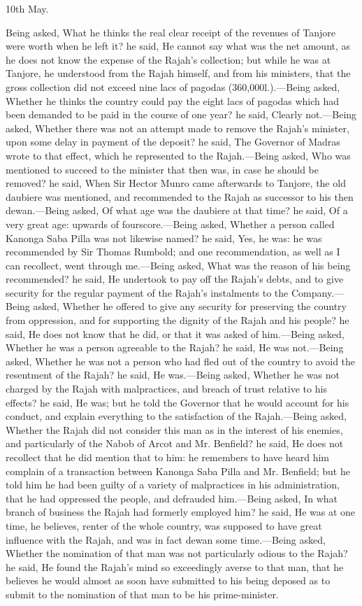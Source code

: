 \vspace{0.3cm}
\hfill 10th May.

Being asked, What he thinks the real clear receipt of the revenues of Tanjore were worth when he left it? he said, He cannot say what was the net amount, as he does not know the expense of the Rajah's collection; but while he was at Tanjore, he understood from the Rajah himself, and from his ministers, that the gross collection did not exceed nine lacs of pagodas (360,000l.).—Being asked, Whether he thinks the country could pay the eight lacs of pagodas which had been demanded to be paid in the course of one year? he said, Clearly not.—Being asked, Whether there was not an attempt made to remove the Rajah's minister, upon some delay in payment of the deposit? he said, The Governor of Madras wrote to that effect, which he represented to the Rajah.—Being asked, Who was mentioned to succeed to the minister that then was, in case he should be removed? he said, When Sir Hector Munro came afterwards to Tanjore, the old daubiere was mentioned, and recommended to the Rajah as successor to his then dewan.—Being asked, Of what age was the daubiere at that time? he said, Of a very great age: upwards of fourscore.—Being asked, Whether a person called Kanonga Saba Pilla was not likewise named? he said, Yes, he was: he was recommended by Sir Thomas Rumbold; and one recommendation, as well as I can recollect, went through me.—Being asked, What was the reason of his being recommended? he said, He undertook to pay off the Rajah's debts, and to give security for the regular payment of the Rajah's instalments to the Company.—Being asked, Whether he offered to give any security for preserving the country from oppression, and for supporting the dignity of the Rajah and his people? he said, He does not know that he did, or that it was asked of him.—Being asked, Whether he was a person agreeable to the Rajah? he said, He was not.—Being asked, Whether he was not a person who had fled out of the country to avoid the resentment of the Rajah? he said, He was.—Being asked, Whether he was not charged by the Rajah with malpractices, and breach of trust relative to his effects? he said, He was; but he told the Governor that he would account for his conduct, and explain everything to the satisfaction of the Rajah.—Being asked, Whether the Rajah did not consider this man as in the interest of his enemies, and particularly of the Nabob of Arcot and Mr. Benfield? he said, He does not recollect that he did mention that to him: he remembers to have heard him complain of a transaction between Kanonga Saba Pilla and Mr. Benfield; but he told him he had been guilty of a variety of malpractices in his administration, that he had oppressed the people, and defrauded him.—Being asked, In what branch of business the Rajah had formerly employed him? he said, He was at one time, he believes, renter of the whole country, was supposed to have great influence with the Rajah, and was in fact dewan some time.—Being asked, Whether the nomination of that man was not particularly odious to the Rajah? he said, He found the Rajah's mind so exceedingly averse to that man, that he believes he would almost as soon have submitted to his being deposed as to submit to the nomination of that man to be his prime-minister.

